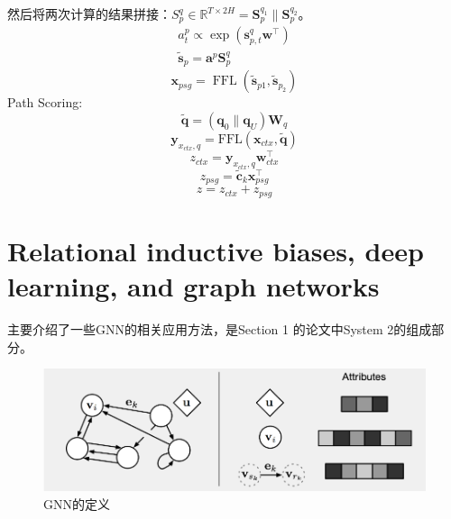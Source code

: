 \documentclass[a4paper,UTF8]{article}
\numberwithin{equation}{section}
\begin{document}
\begin{enumerate}
	然后将两次计算的结果拼接：$S_p^q\in \mathbb{R}^{T \times 2 H}=\mathbf{S}_{p}^{q_{1}} \| \mathbf{S}_{p}^{q_{2}}$。
	\begin{equation}
	\begin{array}{l}{a_{t}^{p} \propto \exp \left(\mathbf{s}_{p, t}^{q} \mathbf{w}^{\top}\right)} \\ {\tilde{\mathbf{s}}_{p}=\mathbf{a}^{p} \mathbf{S}_{p}^{q}}\end{array}
	\end{equation}
	\begin{equation}
		\mathbf{x}_{p s g}=\operatorname{FFL}\left(\tilde{\mathbf{s}}_{p 1}, \tilde{\mathbf{s}}_{p_{2}}\right)
		\end{equation}
	\subitem[3] Path Scoring:
	\begin{equation}
		\tilde{\mathbf{q}}=\left(\mathbf{q}_{0} \| \mathbf{q}_{U}\right) \mathbf{W}_{q}
		\end{equation}
		\begin{equation}
			\mathbf{y}_{x_{c t x}, q}=\mathrm{FFL}\left(\mathbf{x}_{c t x}, \tilde{\mathbf{q}}\right)
			\end{equation}
			\begin{equation}
				z_{c t x}=\mathbf{y}_{x_{c t x}, q} \mathbf{w}_{c t x}^{\top}
				\end{equation}
				\begin{equation}
					z_{p s g}=\tilde{\mathbf{c}}_{k} \mathbf{x}_{p s g}^{\top}
					\end{equation}
					\begin{equation}
						z=z_{c t x}+z_{p s g}
						\end{equation}
\end{enumerate}

\newpage
\section{Relational inductive biases, deep learning, and graph networks}
主要介绍了一些GNN的相关应用方法，是Section 1 的论文中System 2的组成部分。
\begin{figure}[H]
	\centering
	\includegraphics[width=\textwidth]{3-1.png}
	\caption{GNN的定义}
\end{figure}
\end{document}
